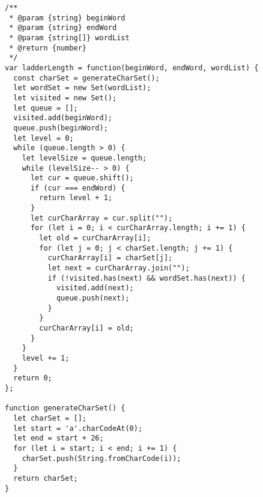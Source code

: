 \begin{verbatim}
/**
 * @param {string} beginWord
 * @param {string} endWord
 * @param {string[]} wordList
 * @return {number}
 */
var ladderLength = function(beginWord, endWord, wordList) {
  const charSet = generateCharSet();
  let wordSet = new Set(wordList);
  let visited = new Set();
  let queue = [];
  visited.add(beginWord);
  queue.push(beginWord);
  let level = 0;
  while (queue.length > 0) {
    let levelSize = queue.length;
    while (levelSize-- > 0) {
      let cur = queue.shift();
      if (cur === endWord) {
        return level + 1;
      }
      let curCharArray = cur.split("");
      for (let i = 0; i < curCharArray.length; i += 1) {
        let old = curCharArray[i];
        for (let j = 0; j < charSet.length; j += 1) {
          curCharArray[i] = charSet[j];
          let next = curCharArray.join("");
          if (!visited.has(next) && wordSet.has(next)) {
            visited.add(next);
            queue.push(next);
          }
        }
        curCharArray[i] = old;
      }
    }
    level += 1;
  }
  return 0;
};

function generateCharSet() {
  let charSet = [];
  let start = 'a'.charCodeAt(0);
  let end = start + 26;
  for (let i = start; i < end; i += 1) {
    charSet.push(String.fromCharCode(i));
  }
  return charSet;
}
\end{verbatim}
